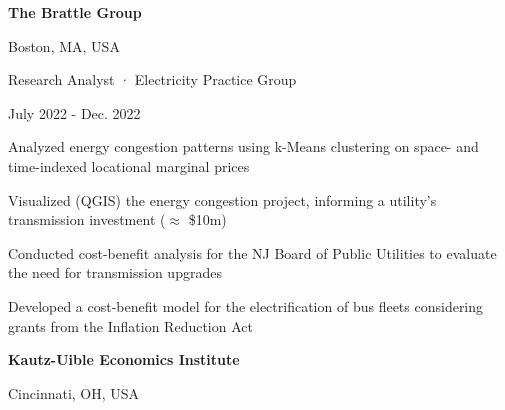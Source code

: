 \documentclass[a4paper,20pt]{article}
\begin{document}
    \begin{minipage}{.75\linewidth} \begin{flushleft}
    		\textbf{The Brattle Group}
    	\end{flushleft} \end{minipage}
    \hfill 
    \begin{minipage}{.20\linewidth}\begin{flushright}
    	 Boston, MA, USA
    	\end{flushright}\end{minipage}
     
    \begin{minipage}{.75\linewidth} \begin{flushleft}
    		Research Analyst · Electricity Practice Group
    	\end{flushleft} \end{minipage}
    \hfill 
    \begin{minipage}{.20\linewidth}\begin{flushright}
    	 July 2022 - Dec. 2022
    	\end{flushright}\end{minipage}
        \vspace{-5pt}
	\begin{description}[font=$\bullet$]
	\item{Analyzed energy congestion patterns using k-Means clustering on space- and time-indexed locational marginal prices}
        \vspace{-7pt}
        \item{Visualized (QGIS) the energy congestion project, informing a utility's transmission investment ($\approx$ \$10m)}
        \vspace{-7pt}
        \item{Conducted cost-benefit analysis for the NJ Board of Public Utilities to evaluate the need for transmission upgrades} 
        \vspace{-7pt}
        \item{Developed a cost-benefit model for the electrification of bus fleets considering grants from the Inflation Reduction Act}
	\end{description}

    \begin{minipage}{.75\linewidth} \begin{flushleft}
    		\textbf{Kautz-Uible Economics Institute}
    	\end{flushleft} \end{minipage}
    \hfill 
    \begin{minipage}{.20\linewidth}\begin{flushright}
    	 Cincinnati, OH, USA
    	\end{flushright}\end{minipage}
     
\end{document}
